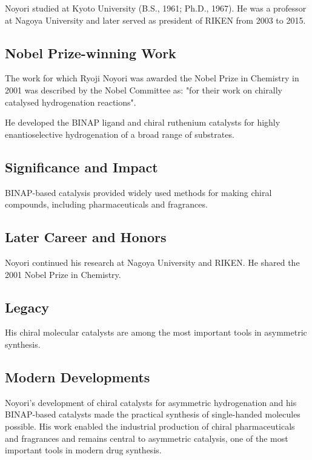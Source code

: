 Noyori studied at Kyoto University (B.S., 1961; Ph.D., 1967). He was a professor at Nagoya University and later served as president of RIKEN from 2003 to 2015.

\subsection*{Nobel Prize-winning Work}

The work for which Ryoji Noyori was awarded the Nobel Prize in Chemistry in 2001 was described by the Nobel Committee as: "for their work on chirally catalysed hydrogenation reactions".

He developed the BINAP ligand and chiral ruthenium catalysts for highly enantioselective hydrogenation of a broad range of substrates.

\subsection*{Significance and Impact}

BINAP-based catalysis provided widely used methods for making chiral compounds, including pharmaceuticals and fragrances.

\subsection*{Later Career and Honors}

Noyori continued his research at Nagoya University and RIKEN. He shared the 2001 Nobel Prize in Chemistry.

\subsection*{Legacy}

His chiral molecular catalysts are among the most important tools in asymmetric synthesis.

\subsection*{Modern Developments}

Noyori's development of chiral catalysts for asymmetric hydrogenation and his BINAP-based catalysts made the practical synthesis of single-handed molecules possible. His work enabled the industrial production of chiral pharmaceuticals and fragrances and remains central to asymmetric catalysis, one of the most important tools in modern drug synthesis.

